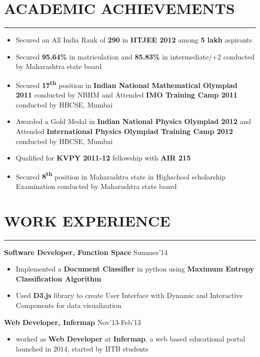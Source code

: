 \message{ !name(resume2.tex)}\documentclass[11pt]{book} %
\begin{document}

\vspace*{1.2cm}
\section*{ACADEMIC ACHIEVEMENTS}
\hrule
\medskip
\vspace{2mm}
\begin{itemize}
\itemsep-0.0em
\item Secured an All India Rank of {\bf 290} in {\bf IITJEE 2012} among {\bf 5 lakh} aspirants
\item Secured {\bf 95.64\%} in matriculation and {\bf 85.83\%} in intermediate/+2 conducted by Maharashtra state board
\item Secured {\bf 17\textsuperscript{th}} position in {\bf Indian National Mathematical Olympiad 2011} conducted by NBHM and Attended 
{\bf IMO Training Camp 2011} conducted by HBCSE, Mumbai
\item Awarded a Gold Medal in {\bf Indian National Physics Olympiad 2012} and Attended {\bf International Physics 
Olympiad Training Camp 2012} conducted by HBCSE, Mumbai
\item Qualified for {\bf KVPY 2011-12} fellowship with {\bf AIR 215}
\item Secured {\bf 8\textsuperscript{th}} position in Maharashtra state in Highschool scholarship Examination conducted by Maharashtra 
state board
\end{itemize}
\vspace{-3mm}

\section*{WORK EXPERIENCE}
\hrule
\medskip
\vspace{2mm}
\noindent \textbf{Software Developer, Function Space} \hfill Summer'14
\vspace{-2mm}
\begin{itemize}
\itemsep-0.1em
\item Implemented a \textbf{Document Classifier} in python using \textbf{Maximum Entropy Classification Algorithm}
\item Used \textbf{D3.js} library to create User Interface with Dynamic and Interactive Components for data visualization
\end{itemize}

\noindent \textbf{Web Developer, Infermap} \hfill Nov'13-Feb'13
\vspace{-2mm}
\begin{itemize}
\itemsep-0.1em
\item worked as \textbf{Web Developer} at \textbf{Infermap}, a web based educational portal launched in 2014, started by IITB students
\end{itemize}
\vspace{-3mm}
\end{document}
